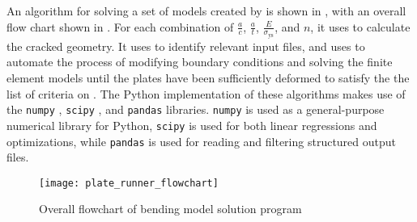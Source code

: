 An algorithm for solving a set of models created by  is shown in , with an overall flow chart shown in .
For each combination of \(\frac{a}{c}\), \(\frac{a}{t}\), \(\frac{E}{\sigma_{\text{ys}}}\), and \(n\), it uses  to calculate the cracked geometry.
It uses  to identify relevant input files, and uses  to automate the process of modifying boundary conditions and solving the finite element models until the plates have been sufficiently deformed to satisfy the the list of criteria on .
The Python implementation of these algorithms makes use of the \verb|numpy| \cite{numpy}, \verb|scipy| \cite{scipy}, and  \verb|pandas| \cite{mckinney-proc-scipy-2010} libraries.
\verb|numpy| is used as a general-purpose numerical library for Python, \verb|scipy| is used for both linear regressions and optimizations, while \verb|pandas| is used for reading and filtering structured output files.
\begin{figure}
\centering
\texttt{[image: plate\_runner\_flowchart]}
\caption{\label{fig:plate_runner_flowchart} Overall flowchart of bending model solution program}
\end{figure}


